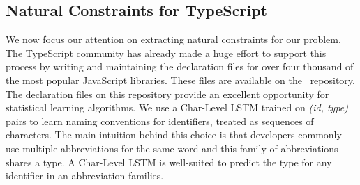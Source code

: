 \documentclass[sigplan,10pt,review,anonymous]{acmart} %
\theoremstyle{plain}
\theoremstyle{remark}
\theoremstyle{definition}
\begin{document}
\subsection{Natural Constraints for TypeScript}\label{ssec:natprodts}
We now focus our attention on extracting natural constraints for
our problem.
The TypeScript community has already
made a huge effort to support this process by writing and maintaining the
declaration files for over four thousand of the most popular JavaScript
libraries. These files are available on the~\citet{definitelytyped}
repository. The declaration files on this repository provide an excellent
opportunity for statistical learning algorithms.
We use a Char-Level LSTM trained on
\textit{(id, type)} pairs to learn naming conventions
for identifiers, treated as sequences of characters.
The main intuition behind this choice is that
developers commonly use multiple abbreviations for the same word and 
this family of abbreviations shares a type.
A Char-Level LSTM is well-suited to predict the type for any identifier in 
an abbreviation families.
\end{document}
